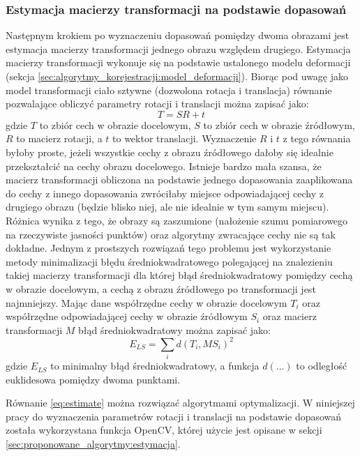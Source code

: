 \subsubsection{Estymacja macierzy transformacji na podstawie dopasowań}

Następnym krokiem po wyznaczeniu dopasowań pomiędzy dwoma obrazami jest estymacja macierzy transformacji jednego obrazu względem drugiego. Estymacja macierzy transformacji wykonuje się na podstawie ustalonego modelu deformacji (sekcja \ref{sec:algorytmy_korejestracji:model_deformacji}). Biorąc pod uwagę jako model transformacji ciało sztywne (dozwolona rotacja i translacja) równanie pozwalające obliczyć parametry rotacji i translacji można zapisać jako:
\begin{equation}
T=SR+t
\end{equation}
gdzie $T$ to zbiór cech w obrazie docelowym, $S$ to zbiór cech w obrazie źródłowym, $R$ to macierz rotacji, a $t$ to wektor translacji. Wyznaczenie $R$ i $t$ z tego równania byłoby proste, jeżeli wszystkie cechy z obrazu źródłowego dałoby się idealnie przekształcić na cechy obrazu docelowego. Istnieje bardzo mała szansa, że macierz transformacji obliczona na podstawie jednego dopasowania zaaplikowana do cechy z innego dopasowania zwróciłaby miejsce odpowiadającej cechy z drugiego obrazu (będzie blisko niej, ale nie idealnie w tym samym miejscu). Różnica wynika z tego, że obrazy są zaszumione (nałożenie szumu pomiarowego na rzeczywiste jasności punktów) oraz algorytmy zwracające cechy nie są tak dokładne. Jednym z prostszych rozwiązań tego problemu jest wykorzystanie metody minimalizacji błędu średniokwadratowego polegającej na znalezieniu takiej macierzy transformacji dla której błąd średniokwadratowy pomiędzy cechą w obrazie docelowym, a cechą z obrazu źródłowego po transformacji jest najmniejszy. Mając dane współrzędne cechy w obrazie docelowym $T_{i}$ oraz współrzędne odpowiadającej cechy w obrazie źródłowym $S_{i}$ oraz macierz transformacji $M$ błąd średniokwadratowy można zapisać jako:
\begin{equation}
E_{LS}=\sum_{i}d(T_{i}, MS_{i})^2
\label{eq:estimate}
\end{equation}
gdzie $E_{LS}$ to minimalny błąd średniokwadratowy, a funkcja $d(...)$ to odległość euklidesowa pomiędzy dwoma punktami.

Równanie \ref{eq:estimate} można rozwiązać algorytmami optymalizacji. W niniejszej pracy do wyznaczenia parametrów rotacji i translacji na podstawie dopasowań została wykorzystana funkcja OpenCV, której użycie jest opisane w sekcji \ref{sec:proponowane_algorytmy:estymacja}.

